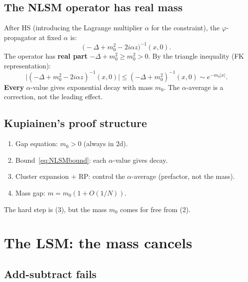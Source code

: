 \documentclass[12pt]{article}
\theoremstyle{definition}
\theoremstyle{remark}
\newcommand{\ph}{\varphi}
\begin{document}
\subsection{The NLSM operator has real mass}

After HS (introducing the Lagrange multiplier $\alpha$ for the
constraint), the $\ph$-propagator at fixed $\alpha$ is:
\begin{equation}
  \bigl(-\Delta + m_0^2 - 2i\alpha z\bigr)^{-1}(x,0).
\end{equation}
The operator has \textbf{real part} $-\Delta + m_0^2 \ge m_0^2 > 0$.
By the triangle inequality (FK representation):
\begin{equation}
\label{eq:NLSMbound}
  \bigl|(-\Delta+m_0^2-2i\alpha z)^{-1}(x,0)\bigr|
    \le (-\Delta+m_0^2)^{-1}(x,0)
    \sim e^{-m_0|x|}.
\end{equation}
\textbf{Every} $\alpha$-value gives exponential decay with mass $m_0$.
The $\alpha$-average is a correction, not the leading effect.

\subsection{Kupiainen's proof structure}

\begin{enumerate}
\item Gap equation: $m_0 > 0$ (always in 2d).
\item Bound~\eqref{eq:NLSMbound}: each $\alpha$-value gives decay.
\item Cluster expansion + RP: control the $\alpha$-average
  (prefactor, not the mass).
\item Mass gap: $m = m_0(1 + O(1/N))$.
\end{enumerate}

The hard step is (3), but the mass $m_0$ comes for free from (2).

\section{The LSM: the mass cancels}

\subsection{Add-subtract fails}
\end{document}
